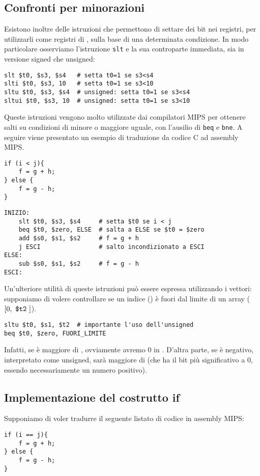 \subsection*{Confronti per minorazioni}
Esistono inoltre delle istruzioni che permettono di settare dei bit nei registri, per utilizzarli come registri di , sulla base di una determinata condizione. In modo particolare osserviamo l'istruzione \texttt{slt} e la sua controparte immediata, sia in versione signed che unsigned:
\begin{verbatim}
slt $t0, $s3, $s4   # setta t0=1 se s3<s4
slti $t0, $s3, 10   # setta t0=1 se s3<10
sltu $t0, $s3, $s4  # unsigned: setta t0=1 se s3<s4
sltui $t0, $s3, 10  # unsigned: setta t0=1 se s3<10
\end{verbatim}
Queste istruzioni vengono molto utilizzate dai compilatori MIPS per ottenere salti su condizioni di minore o maggiore uguale, con l'ausilio di \texttt{beq} e \texttt{bne}. A seguire viene presentato un esempio di traduzione da codice C ad assembly MIPS.
\begin{verbatim}
if (i < j){
	f = g + h;
} else {
	f = g - h;
}
\end{verbatim}
\begin{verbatim}
INIZIO:
	slt $t0, $s3, $s4     # setta $t0 se i < j
	beq $t0, $zero, ELSE  # salta a ELSE se $t0 = $zero
	add $s0, $s1, $s2     # f = g + h
	j ESCI                # salto incondizionato a ESCI
ELSE:
	sub $s0, $s1, $s2     # f = g - h
ESCI:
\end{verbatim}
Un'ulteriore utilità di queste istruzioni può essere espressa utilizzando i vettori: supponiamo di volere controllare se un indice () è fuori dal limite di un array (\([0, \text{ \texttt{\$t2} }]\)).
\begin{verbatim}
sltu $t0, $s1, $t2  # importante l'uso dell'unsigned
beq $t0, $zero, FUORI_LIMITE
\end{verbatim}
Infatti, se  è maggiore di , ovviamente avremo 0 in . D'altra parte, se  è negativo, interpretato come unsigned, sarà maggiore di  (che ha il bit più significativo a 0, essendo  necessariamente un numero positivo).

\subsection*{Implementazione del costrutto if}
Supponiamo di voler tradurre il seguente listato di codice in assembly MIPS:
\begin{verbatim}
if (i == j){
	f = g + h;
} else {
	f = g - h;
}
\end{verbatim}

